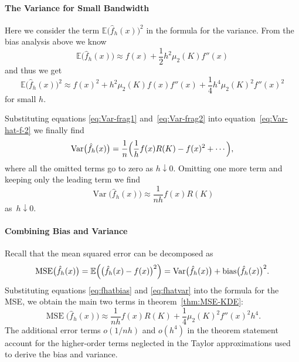 \documentclass[
  a4paper,
]{article}
\theoremstyle{definition}
\theoremstyle{definition}
\theoremstyle{definition}
\theoremstyle{definition}
\theoremstyle{remark}
\begin{document}
\paragraph{The Variance for Small Bandwidth}\label{the-variance-for-small-bandwidth}

Here we consider the term \(\mathbb{E}\bigl( \hat f_h(x) \bigr)^2\) in the formula
for the variance. From the bias analysis above we know
\begin{equation*}
    \mathbb{E}\bigl( \hat f_h(x) \bigr)
    \approx f(x) + \frac12 h^2 \mu_2(K) f''(x)
\end{equation*}
and thus we get
\begin{equation}
    \mathbb{E}\bigl( \hat f_h(x) \bigr)^2
    \approx f(x)^2 + h^2 \mu_2(K) f(x) f''(x) + \frac14 h^4 \mu_2(K)^2 f''(x)^2
                             \label{eq:Var-frag2}
\end{equation}
for small \(h\).

Substituting equations \eqref{eq:Var-frag1} and~\eqref{eq:Var-frag2} into
equation~\eqref{eq:Var-hat-f-2} we finally find
\begin{equation*}
  \mathop{\mathrm{Var}}\bigl( \hat f_h(x) \bigr)
  = \frac{1}{n} \Bigl(
    \frac{1}{h} f(x) R(K)
    - f(x)^2
    + \cdots
   \Bigr),
\end{equation*}
where all the omitted terms go to zero as \(h \downarrow 0\).
Omitting one more term and keeping only the leading term
we find
\begin{equation}
  \mathop{\mathrm{Var}}\bigl( \hat f_h(x) \bigr)
  \approx \frac{1}{nh} f(x) R(K)     \label{eq:fhatvar}
\end{equation}
as~\(h\downarrow 0\).

\paragraph{Combining Bias and Variance}\label{combining-bias-and-variance}

Recall that the mean squared error can be decomposed as
\begin{equation*}
  \mathop{\mathrm{MSE}}\nolimits\bigl( \hat f_h(x) \bigr)
  = \mathbb{E}\Bigl( \bigl( \hat f_h(x) - f(x) \bigr)^2 \Bigr)
  = \mathop{\mathrm{Var}}\bigl( \hat f_h(x) \bigr) + \mathop{\mathrm{bias}}\bigl( \hat f_h(x) \bigr)^2.
\end{equation*}
Substituting equations \eqref{eq:fhatbias} and \eqref{eq:fhatvar} into
the formula for the MSE, we obtain the main two terms in theorem~\ref{thm:MSE-KDE}:
\begin{equation*}
  \mathop{\mathrm{MSE}}\nolimits\bigl( \hat f_h(x) \bigr)
  \approx \frac{1}{nh} f(x) R(K) + \frac14 \mu_2(K)^2 f''(x)^2 h^4.
\end{equation*}
The additional error terms \(o(1/nh)\) and \(o(h^4)\) in the theorem statement
account for the higher-order terms neglected in the Taylor approximations
used to derive the bias and variance.
\end{document}
